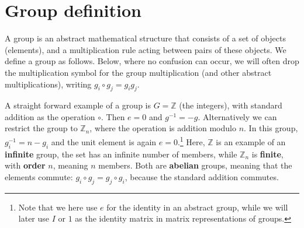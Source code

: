 \documentclass[notes.tex]{subfiles}
\begin{document}
\section{Group definition}
A group is an abstract mathematical structure that consists of a set of objects (elements), and a multiplication rule acting between pairs of these objects. We define a group as follows.
Below, where no confusion can occur, we will often drop the multiplication symbol for the group multiplication (and other abstract multiplications), writing $g_i \circ g_j =g_ig_j$.
 
A straight forward example of a group is $G= \mathbb{Z}$ (the integers), with standard addition as the operation $\circ$. Then $e = 0$ and $g^{-1} = -g$. Alternatively we can restrict the group to $\mathbb{Z}_n$, where the operation is addition modulo $n$. In this group, $g_i^{-1} = n - g_i$ and the unit element is again $e = 0$.\footnote{Note that we here use $e$ for the identity in an abstract group, while we will later use $I$ or $1$ as the identity matrix in matrix representations of groups.} 
Here, $\mathbb{Z}$ is an example of an {\bf infinite} group, the set has an infinite number of members, while $\mathbb{Z}_n$ is {\bf finite}, with {\bf order} $n$, meaning $n$ members. Both are {\bf abelian} groups, meaning that the elements commute: $g_i \circ g_j = g_j \circ g_i$, because the standard addition commutes.
\end{document}
